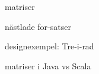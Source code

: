 \item matriser
\item nästlade for-satser
\item designexempel: Tre-i-rad
\item matriser i Java vs Scala